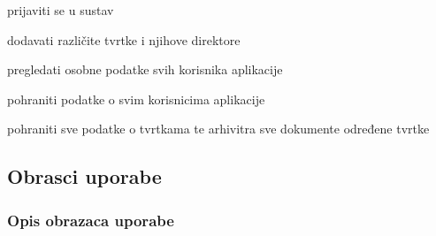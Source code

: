 \begin{packed_enum}
\begin{packed_enum}
					\item prijaviti se u sustav
					\item dodavati različite tvrtke i njihove direktore
					\item pregledati osobne podatke svih korisnika aplikacije
					
					
				\end{packed_enum}
				
				\clearpage
				
				\item  {}
				\begin{packed_enum}
					
					\item pohraniti podatke o svim korisnicima aplikacije
					\item pohraniti sve podatke o tvrtkama te arhivitra sve dokumente određene tvrtke
					
				\end{packed_enum}
				
				
			\end{packed_enum}
			
			\eject 
			
			
				
			\subsection{Obrasci uporabe}
							
				\subsubsection{Opis obrazaca uporabe}


